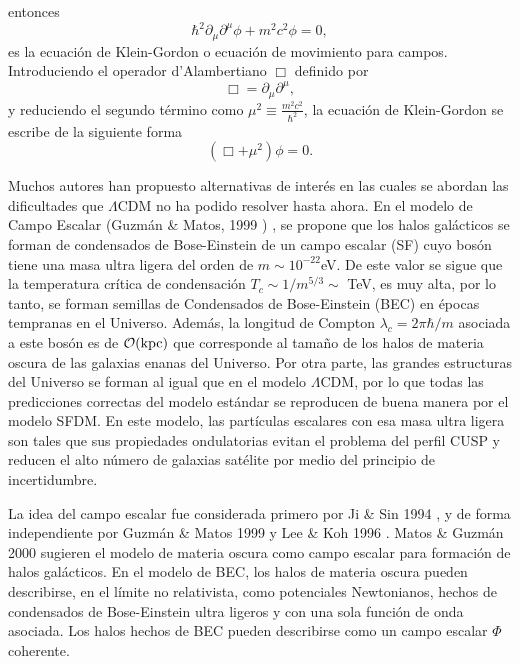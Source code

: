 \documentclass[a4paper,openright,12pt]{book}
\begin{document}
entonces
\begin{equation}
\hbar^{2}\partial_{\mu}\partial^{\mu}\phi + m^{2}c^{2}\phi = 0,\label{eqn 1.51}
\end{equation}
es la ecuación de Klein-Gordon o ecuación de movimiento para campos. Introduciendo el operador d'Alambertiano $\Box$ definido por
\begin{equation}
\Box = \partial_{\mu}\partial^{\mu},\label{eqn 1.52}
\end{equation}
y reduciendo el segundo término como $\mu^{2}\equiv\frac{m^{2}c^{2}}{\hbar^{2}}$, la ecuación de Klein-Gordon se escribe de la siguiente forma
\begin{equation}
\left(\Box + \mu^{2}\right)\phi = 0.\label{eqn 1.53}
\end{equation}

Muchos autores han propuesto alternativas de interés en las cuales se abordan las dificultades que $\Lambda$CDM no ha podido resolver hasta ahora. En el modelo de Campo Escalar (Guzmán \& Matos, 1999 \cite{Siddhartha Matos}) , se propone que los halos galácticos se forman de condensados de Bose-Einstein de un campo escalar (SF) cuyo bosón tiene una masa ultra ligera del orden de $m \sim 10^{-22}$eV. De este valor se sigue que la temperatura crítica de condensación $T_{c} \sim 1/m^{5/3} \sim $ TeV, es muy alta, por lo tanto, se forman semillas de Condensados de Bose-Einstein (BEC) en épocas tempranas en el Universo. Además, la longitud de Compton $\lambda_{c} = 2\pi \hbar / m$ asociada a este bosón es de $\mathcal{O}(\textup{kpc})$ que corresponde al tamaño de los halos de materia oscura de las galaxias enanas del Universo. Por otra parte, las grandes estructuras del Universo se forman al igual que en el modelo $\Lambda$CDM, por lo que todas las predicciones correctas del modelo estándar se reproducen de buena manera por el modelo SFDM. En este modelo, las partículas escalares con esa masa ultra ligera son tales que sus propiedades ondulatorias evitan el problema del perfil CUSP y reducen el alto número de galaxias satélite por medio del principio de incertidumbre.

La idea del campo escalar fue considerada primero por Ji \& Sin 1994 \cite{1.3.01}, y de forma independiente por Guzmán \& Matos 1999 \cite{Siddhartha Matos} y Lee \& Koh 1996 \cite{1.3.02}. Matos \& Guzmán 2000 \cite{1.3.03} sugieren el modelo de materia oscura como campo escalar para formación de halos galácticos. En el modelo de BEC, los halos de materia oscura pueden describirse, en el límite no relativista, como potenciales Newtonianos, hechos de condensados de Bose-Einstein ultra ligeros y con una sola función de onda asociada. Los halos hechos de BEC pueden describirse como un campo escalar $\Phi$ coherente.
\end{document}
